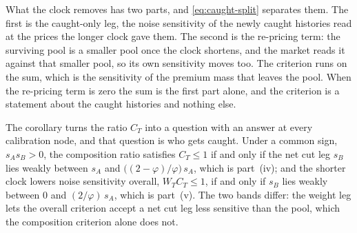 What the clock removes has two parts, and \eqref{eq:caught-split} separates them. The first is the
caught-only leg, the noise sensitivity of the newly caught histories read at the prices the longer
clock gave them. The second is the re-pricing term: the surviving pool is a smaller pool once the
clock shortens, and the market reads it against that smaller pool, so its own sensitivity moves
too. The criterion runs on the sum, which is the sensitivity of the premium mass that leaves the
pool. When the re-pricing term is zero the sum is the first part alone, and the criterion is
a statement about the caught histories and nothing else.

The corollary turns the ratio $C_T$ into a question with an answer at every calibration node, and
that question is who gets caught. Under a common sign, $s_A s_B > 0$, the composition ratio
satisfies $C_T \le 1$ if and only if the net cut leg $s_B$ lies weakly between $s_A$ and
$\bigl((2-\varphi)/\varphi\bigr)\,s_A$, which is part~(iv); and the shorter clock lowers noise
sensitivity overall, $W_T C_T \le 1$, if and only if $s_B$ lies weakly between $0$ and
$(2/\varphi)\,s_A$, which is part~(v). The two bands differ: the weight leg lets the overall
criterion accept a net cut leg less sensitive than the pool, which the composition criterion alone
does not.


